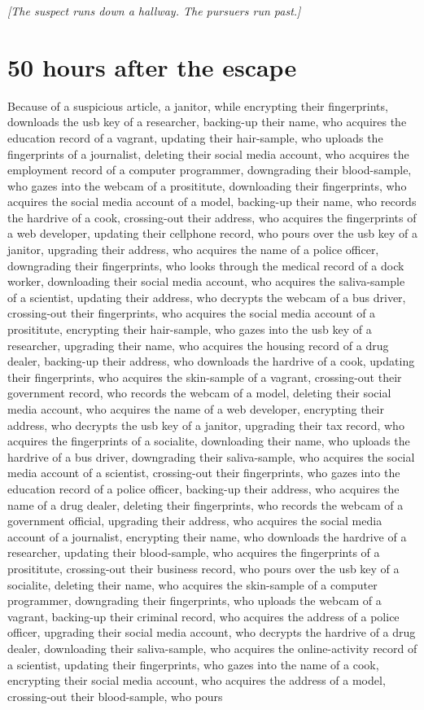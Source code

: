 \documentclass{report}
\begin{document}
\textit{[The suspect runs down a hallway. The pursuers run past.]}


\section*{50 \small{hours after the escape}}

Because of a suspicious article, a janitor, while encrypting their fingerprints, downloads the usb key of a researcher, backing-up their name, who acquires the education record of a vagrant, updating their hair-sample, who uploads the fingerprints of a journalist, deleting their social media account, who acquires the employment record of a computer programmer, downgrading their blood-sample, who gazes into the webcam of a prosititute, downloading their fingerprints, who acquires the social media account of a model, backing-up their name, who records the hardrive of a cook, crossing-out their address, who acquires the fingerprints of a web developer, updating their cellphone record, who pours over the usb key of a janitor, upgrading their address, who acquires the name of a police officer, downgrading their fingerprints, who looks through the medical record of a dock worker, downloading their social media account, who acquires the saliva-sample of a scientist, updating their address, who decrypts the webcam of a bus driver, crossing-out their fingerprints, who acquires the social media account of a prosititute, encrypting their hair-sample, who gazes into the usb key of a researcher, upgrading their name, who acquires the housing record of a drug dealer, backing-up their address, who downloads the hardrive of a cook, updating their fingerprints, who acquires the skin-sample of a vagrant, crossing-out their government record, who records the webcam of a model, deleting their social media account, who acquires the name of a web developer, encrypting their address, who decrypts the usb key of a janitor, upgrading their tax record, who acquires the fingerprints of a socialite, downloading their name, who uploads the hardrive of a bus driver, downgrading their saliva-sample, who acquires the social media account of a scientist, crossing-out their fingerprints, who gazes into the education record of a police officer, backing-up their address, who acquires the name of a drug dealer, deleting their fingerprints, who records the webcam of a government official, upgrading their address, who acquires the social media account of a journalist, encrypting their name, who downloads the hardrive of a researcher, updating their blood-sample, who acquires the fingerprints of a prosititute, crossing-out their business record, who pours over the usb key of a socialite, deleting their name, who acquires the skin-sample of a computer programmer, downgrading their fingerprints, who uploads the webcam of a vagrant, backing-up their criminal record, who acquires the address of a police officer, upgrading their social media account, who decrypts the hardrive of a drug dealer, downloading their saliva-sample, who acquires the online-activity record of a scientist, updating their fingerprints, who gazes into the name of a cook, encrypting their social media account, who acquires the address of a model, crossing-out their blood-sample, who pours 
\end{document}
